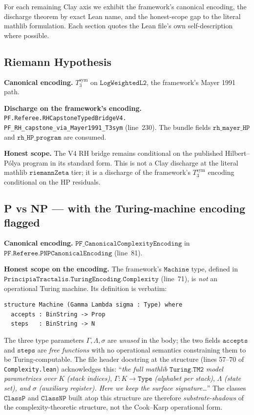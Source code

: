 \documentclass[11pt,a4paper]{article}
\theoremstyle{plain}
\theoremstyle{definition}
\begin{document}
For each remaining Clay axis we exhibit the framework's canonical
encoding, the discharge theorem by exact Lean name, and the
honest-scope gap to the literal mathlib formulation. Each section
quotes the Lean file's own self-description where possible.

\subsection{Riemann Hypothesis}
\label{sec:rh}

\textbf{Canonical encoding.} $T_{3}^{\mathrm{sym}}$ on
$\mathtt{LogWeightedL2}$, the framework's Mayer 1991 path.

\textbf{Discharge on the framework's encoding.}
\texttt{PF.Referee.RHCapstoneTypedBridgeV4.\\
PF\_RH\_capstone\_via\_Mayer1991\_T3sym} (line~230). The bundle
fields $\mathtt{rh\_mayer\_HP}$ and $\mathtt{rh\_HP\_program}$
are consumed.

\textbf{Honest scope.} The V4 RH bridge remains conditional on
the published Hilbert--P\'olya program in its standard form.
This is not a Clay discharge at the literal mathlib
$\mathtt{riemannZeta}$ tier; it is a discharge of the framework's
$T_{3}^{\mathrm{sym}}$ encoding conditional on the
HP residuals.

\subsection{P vs NP --- with the Turing-machine encoding flagged}
\label{sec:pnp}
\label{sec:pnp-honest}

\textbf{Canonical encoding.}
$\mathtt{PF\_CanonicalComplexityEncoding}$ in
$\mathtt{PF.Referee.PNPCanonicalEncoding}$ (line~81).

\textbf{Honest scope on the encoding.} The framework's
$\mathtt{Machine}$ type, defined in
$\mathtt{PrincipiaTractalis.TuringEncoding.Complexity}$ (line~71),
is \emph{not} an operational Turing machine. Its definition is
verbatim:

\begin{verbatim}
structure Machine (Gamma Lambda sigma : Type) where
  accepts : BinString -> Prop
  steps   : BinString -> N
\end{verbatim}

\noindent
The three type parameters $\Gamma, \Lambda, \sigma$ are
\emph{unused} in the body; the two fields $\mathtt{accepts}$ and
$\mathtt{steps}$ are \emph{free functions} with no operational
semantics constraining them to be Turing-computable. The file
header docstring at the structure (lines 57--70 of
\texttt{Complexity.lean}) acknowledges this: ``\emph{the full
mathlib} $\mathtt{Turing.TM2}$ \emph{model parametrizes over}
$K$ \emph{(stack indices)}, $\Gamma : K \to \mathtt{Type}$
\emph{(alphabet per stack)}, $\Lambda$ \emph{(state set), and}
$\sigma$ \emph{(auxiliary register). Here we keep the surface
signature\ldots}'' The classes $\mathtt{ClassP}$ and
$\mathtt{ClassNP}$ built atop this structure are therefore
\emph{substrate-shadows} of the complexity-theoretic structure,
not the Cook--Karp operational form.
\end{document}
